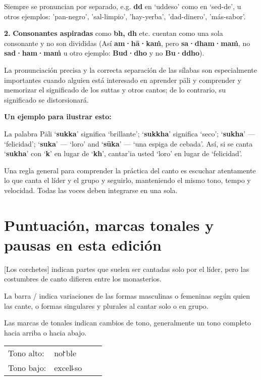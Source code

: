 Siempre se pronuncian por separado, e.g. \textbf{dd} en ‘uddeso’ como en
 ‘sed-de’, u otros ejemplos: 'pan-negro', 'sal-limpio', 'hay-yerba', 'dad-dinero', 'más-sabor'.

\textbf{2.} \textbf{Consonantes aspiradas} como \textbf{bh, dh} etc.
cuentan como una sola consonante y no son divididas (Así
\textbf{am·hā·kaṁ}, pero \textbf{sa·dham·maṁ}, no \textbf{sad·ham·maṁ}
u otro ejemplo: \textbf{Bud·dho} y no \textbf{Bu·ddho}).

La pronunciación precisa y la correcta separación de las sílabas son especialmente importantes cuando alguien está interesado en aprender pāli y comprender y memorizar el significado de los suttas y otros cantos; de lo contrario, su significado se distorsionará.


\textbf{Un ejemplo para ilustrar esto:}

La palabra Pāli ‘\textbf{sukka}’ significa ‘brillante’; ‘\textbf{sukkha}’ significa
‘seco’; ‘\textbf{sukha}’ --- ‘felicidad’; ‘\textbf{suka}’ --- ‘loro’ and
‘\textbf{sūka}’ --- ‘una espiga de cebada'.
Así, si se canta ‘\textbf{sukha}’ con ‘\textbf{k}’ en lugar de
‘\textbf{kh}’, cantar'ia usted ‘loro’ en lugar de ‘felicidad’.

Una regla general para comprender la práctica del canto es escuchar atentamente lo que canta el líder y el grupo y seguirlo, manteniendo el mismo tono, tempo y velocidad. Todas las voces deben integrarse en una sola.

\section{Puntuación, marcas tonales y pausas en esta edición}

[Los corchetes] indican partes que suelen ser cantadas solo por el líder, pero las costumbres de canto difieren entre los monasterios.

La barra / indica variaciones de las formas masculinas o femeninas según quien las cante, o formas singulares y plurales al cantar solo o en grupo.

Las marcas de tonales indican cambios de tono, generalmente un tono completo hacia arriba o hacia abajo.

\begin{tabular}{llll}
	Tono alto: & no꜓ble \\
	Tono bajo: & excel꜕so \\
\end{tabular}

%
